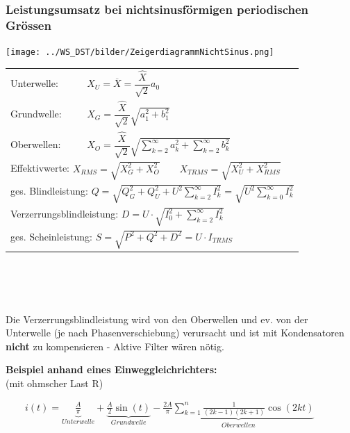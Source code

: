 		\subsubsection{Leistungsumsatz bei nichtsinusförmigen periodischen Grössen}
		\begin{minipage}[c]{7.5cm}
			\texttt{[image: ../WS\_DST/bilder/ZeigerdiagrammNichtSinus.png]}     
    	\end{minipage}
		\begin{minipage}[c]{10.5cm}   
    		\noindent
    		\renewcommand{\arraystretch}{2.5}
    		\begin{tabular}{p{1.8cm} p{5.6cm}}
        		Unterwelle: 
        		& $X_{U} = \overline{X} = \dfrac{\hat{X}}{\sqrt{2}} a_0 \qquad $  \\
	     		Grundwelle: 
	     		& $X_{G} = \dfrac{\hat{X}}{\sqrt{2}} \sqrt{a_1^2 + b_1^2} \qquad  $   \\
	     		Oberwellen: 
	     		& $X_{O} = \dfrac{\hat{X}}{\sqrt{2}}
	     		\sqrt{\sum\limits_{k=2}^{\infty}a_k^2 +\sum\limits_{k=2}^{\infty}b_k^2}
	     		\qquad $  \\ \multicolumn{2}{l}{Effektivwerte: $X_{RMS} = \sqrt{X_G^2 + X_O^2} \qquad X_{TRMS} =
	     		\sqrt{X_U^2 + X_{RMS}^2}$ } \\
		\multicolumn{2}{l}{ges. Blindleistung: $Q = \sqrt{Q_G^2 + Q_U^2 + U^2
		\sum\limits_{k=2}^{\infty}I_k^2} = \sqrt{U^2 \sum\limits_{k=0}^{\infty}I_k^2}$} \\ 
		\multicolumn{2}{l}{Verzerrungsblindleistung: $D = U
		\cdot \sqrt{I_0^2 + \sum\limits_{k=2}^{\infty}I_k^2}$} \\
		\multicolumn{2}{l}{ges. Scheinleistung: $S = \sqrt{P^2 + Q^2 + D^2} = U \cdot I_{TRMS}$} \\
		 \end{tabular} \\
		 \renewcommand{\arraystretch}{1}
     	\end{minipage}    		\\ \\
     	Die Verzerrungsblindleistung wird von den Oberwellen und ev. von der Unterwelle (je
     	nach Phasenverschiebung) verursacht und ist mit Kondensatoren \textbf{nicht} zu kompensieren -
     	Aktive Filter wären nötig.
		\\		
		
	\begin{minipage}[c]{8cm} 
	   \textbf{Beispiel anhand eines Einweggleichrichters:}	  	\\
	   (mit ohmscher Last R) 
	\end{minipage}   
	\begin{minipage}[c]{10cm} 	
	   $ \qquad i(t) = \underbrace{\frac{A}{\pi}}_{Unterwelle} + \underbrace{\frac{A}{2}
	   \sin(t)}_{Grundwelle} - \underbrace{\frac{2A}{\pi} \sum\limits_{k=1}^n \frac{1}{(2k-1)(2k+1)} \cos(2kt)}_{Oberwellen} $
	\end{minipage}   
		

